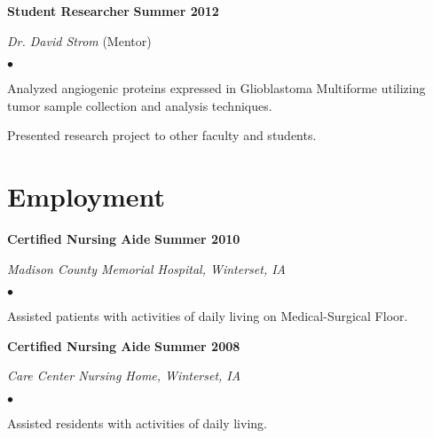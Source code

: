 \documentclass[11pt,letterpaper]{article}
\renewenvironment{itemize}{
  \begin{list}{}{
      \setlength{\leftmargin}{1.5em}
      \setlength{\itemsep}{0.25em}
      \setlength{\parskip}{0pt}
      \setlength{\parsep}{0.25em}
    }
  }{
  \end{list}
}
\newenvironment{bitemize}{
  \begin{list}{$\bullet$}{
      \setlength{\leftmargin}{1.5em}
      \setlength{\itemsep}{0.25em}
      \setlength{\parskip}{0pt}
      \setlength{\parsep}{0.25em}
    }
  }{
  \end{list}
}
\newcommand{\yearrange}[1]{\hfill \textbf{#1} \par}
\begin{document}
\begin{itemize}
\item \textbf{Student Researcher} \yearrange{Summer 2012}
  \textit{Dr. David Strom} (Mentor)
  \begin{bitemize}
  \item Analyzed angiogenic proteins expressed in Glioblastoma
    Multiforme utilizing tumor sample collection and analysis
    techniques. 
  \item Presented research project to other faculty and students.
  \end{bitemize}
\end{itemize}

\section*{Employment}

\begin{itemize}
\item \textbf{Certified Nursing Aide} \yearrange{Summer 2010}
  \textit{Madison County Memorial Hospital, Winterset, IA}
  \begin{bitemize}
    \item Assisted patients with activities of daily living on Medical-Surgical Floor.
  \end{bitemize}
\item \textbf{Certified Nursing Aide} \yearrange{Summer 2008}
  \textit{Care Center Nursing Home, Winterset, IA}
  \begin{bitemize}
    \item Assisted residents with activities of daily living.
  \end{bitemize}
\end{itemize}
\end{document}
